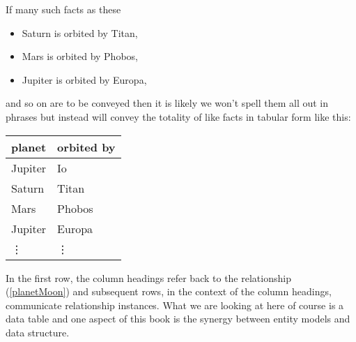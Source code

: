 If many such facts as these
\begin{itemize}
\renewcommand\labelitemi{--} 
\item Saturn is orbited by Titan, 
\item Mars is orbited by Phobos, 
\item Jupiter is orbited by Europa,
\end{itemize}
and so on  are to be conveyed then it is likely we won't spell them all out in phrases 
but instead  will convey the totality of like facts in tabular form like this:
\begin{center}
\begin{tabular}{|l | l|}
\hline
planet & orbited by \\
\hline\hline
Jupiter  & Io \\
\hline
Saturn   & Titan    \\
\hline
Mars     & Phobos    \\
\hline
Jupiter  & Europa         \\
\hline
\vdots    & \vdots  \\
\hline
\end{tabular}
\end{center}
In the first row, the column headings refer  back to the relationship (\ref{planetMoon})
and subsequent rows, in the context of the column headings, communicate relationship instances. 
What we are looking at here of course is a data table and one aspect of this book 
is the synergy between  entity models and data structure.


